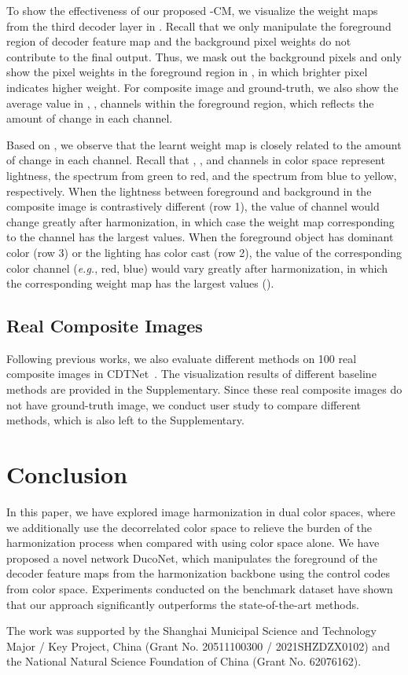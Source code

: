 \documentclass[sigconf]{acmart}
\begin{document}
To show the effectiveness of our proposed -CM, we visualize the weight maps  from the third decoder layer in . Recall that we only manipulate the foreground region of decoder feature map and the background pixel weights do not contribute to the final output. Thus, we mask out the background pixels and only show the pixel weights in the foreground region in , in which brighter pixel indicates higher weight.
For composite image and ground-truth, we also show the average value in , ,  channels within the foreground region, which reflects the amount of change in each channel. 

Based on , we observe that the learnt weight map is closely related to the amount of change in each channel. 
Recall that , , and  channels in  color space represent lightness, the spectrum from green to red, and the spectrum from blue to yellow, respectively. 
When the lightness between foreground and background in the composite image is contrastively different (row 1), the value of  channel would change greatly after harmonization, in which case the weight map  corresponding to the  channel has the largest values. 
When the foreground object has dominant color (row 3) or the lighting has color cast (row 2),  the value of the corresponding color channel (\emph{e.g.}, red, blue) would vary greatly after harmonization, in which the corresponding weight map has the largest values ().

\subsection{Real Composite Images}
Following previous works, we also evaluate different methods on 100 real composite images in CDTNet~\cite{CDTNet}.  The visualization results of different baseline methods are provided in the Supplementary.
Since these real composite images do not have ground-truth image, we conduct user study to compare different methods, which is also left to the Supplementary. 

\section{Conclusion}
In this paper, we have explored image harmonization in dual color spaces, where we additionally use the decorrelated color space  to relieve the burden of the harmonization process when compared with using  color space alone.
We have proposed a novel network DucoNet, which manipulates the foreground of the decoder feature maps from the harmonization backbone using the control codes from  color space. Experiments conducted on the benchmark dataset have shown that our approach significantly outperforms the state-of-the-art methods.

\begin{acks}
 The work was supported by the Shanghai Municipal Science and Technology Major / Key Project, China (Grant No. 20511100300 / 2021SHZDZX0102) and the National Natural Science Foundation of China (Grant No. 62076162).
\end{acks}



\end{document}
